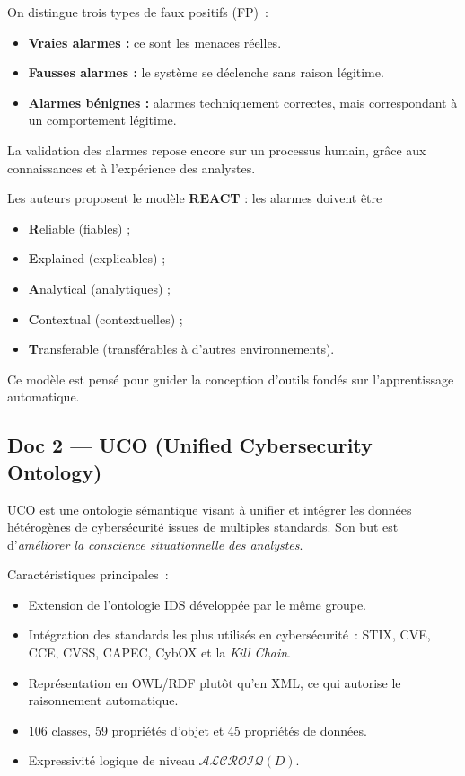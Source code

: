 \documentclass[a4paper,12pt]{article}
\begin{document}
On distingue trois types de faux positifs (FP)~:
\begin{itemize}
    \item \textbf{Vraies alarmes :} ce sont les menaces réelles.
    \item \textbf{Fausses alarmes :} le système se déclenche sans raison légitime.
    \item \textbf{Alarmes bénignes :} alarmes techniquement correctes, mais
          correspondant à un comportement légitime.
\end{itemize}

La validation des alarmes repose encore sur un processus humain, grâce aux
connaissances et à l'expérience des analystes.

Les auteurs proposent le modèle \textbf{REACT} : les alarmes doivent être
\begin{itemize}
    \item \textbf{R}eliable (fiables) ;
    \item \textbf{E}xplained (explicables) ;
    \item \textbf{A}nalytical (analytiques) ;
    \item \textbf{C}ontextual (contextuelles) ;
    \item \textbf{T}ransferable (transférables à d'autres environnements).
\end{itemize}
Ce modèle est pensé pour guider la conception d'outils fondés sur
l'apprentissage automatique.

\subsection{Doc 2 — UCO (Unified Cybersecurity Ontology)}

UCO est une ontologie sémantique visant à unifier et intégrer les données
hétérogènes de cybersécurité issues de multiples standards. Son but est
d'\emph{améliorer la conscience situationnelle des analystes}.

Caractéristiques principales~:
\begin{itemize}
    \item Extension de l'ontologie IDS développée par le même groupe.
    \item Intégration des standards les plus utilisés en cybersécurité~:
          STIX, CVE, CCE, CVSS, CAPEC, CybOX et la \emph{Kill Chain}.
    \item Représentation en OWL/RDF plutôt qu'en XML, ce qui autorise le
          raisonnement automatique.
    \item 106 classes, 59 propriétés d'objet et 45 propriétés de données.
    \item Expressivité logique de niveau $\mathcal{ALCROIQ}(D)$.
\end{itemize}
\end{document}
